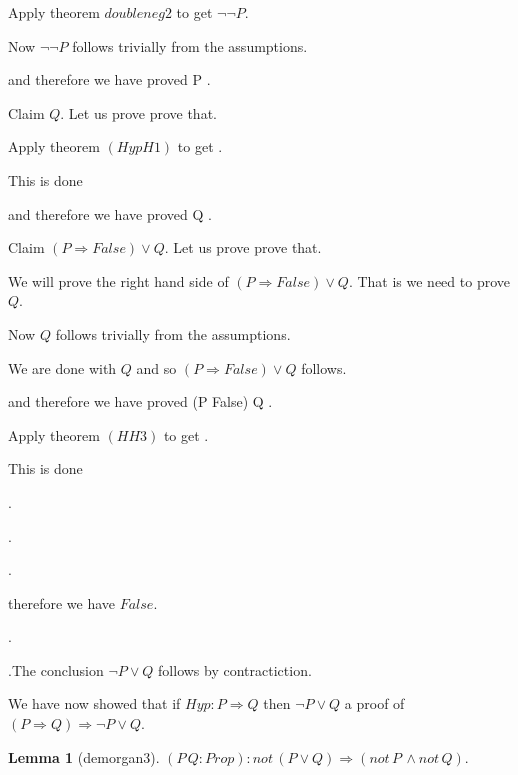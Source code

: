 \documentclass[11pt, oneside]{article}
\newtheorem{Lemma}{Lemma}
\begin{document}
\begin{subproof}
\begin{subproof}
\begin{subproof}
\begin{subproof}
\begin{subproof}
 \begin{subproof}Apply theorem $doubleneg2$ to get $¬ ¬ P $.\begin{subproof}Now $¬ ¬ P $ follows trivially from the assumptions.\end{subproof}\end{subproof} and therefore we have proved P .\begin{subproof}Claim $Q $. Let us prove prove that. 

 \begin{subproof}Apply theorem $(Hyp H1)$ to get $ $.\begin{subproof}This is done\end{subproof}\end{subproof} and therefore we have proved Q .\begin{subproof}Claim $(P \Rightarrow False) \lor Q $. Let us prove prove that. 

 \begin{subproof}We will prove the right hand side of $(P \Rightarrow False) \lor Q $. That is we need to prove $Q $.\begin{subproof}Now $Q $ follows trivially from the assumptions.\end{subproof} We are done with $Q $ and so $(P \Rightarrow False) \lor Q $ follows.\end{subproof} and therefore we have proved (P \Rightarrow False) \lor Q .\begin{subproof}Apply theorem $(H H3)$ to get $ $.\begin{subproof}This is done\end{subproof}\end{subproof}.\end{subproof}.\end{subproof}.\end{subproof} therefore we have $False $.\end{subproof}.\end{subproof}.The conclusion $¬ P \lor Q $ follows by contractiction.\end{subproof} We have now showed that if $Hyp : P \Rightarrow Q $ then $¬ P \lor Q $ a proof of $(P \Rightarrow Q) \Rightarrow ¬ P \lor Q $.\end{subproof}\begin{Lemma}[demorgan3] 
$(P\,Q:Prop):not\,(P\lor Q)\Rightarrow (not\,P\,\land not\,Q).$
 \end{Lemma}
\end{document}
